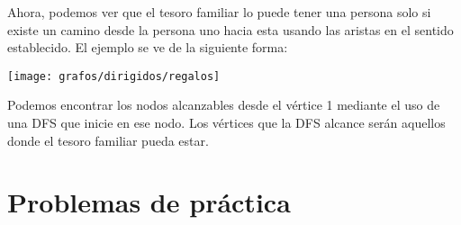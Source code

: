 Ahora, podemos ver que el tesoro familiar lo puede tener una persona solo si existe un camino desde la persona uno hacia esta usando las aristas en el sentido establecido. El ejemplo se ve de la siguiente forma:
\begin{center}
	\texttt{[image: grafos/dirigidos/regalos]}
\end{center}

Podemos encontrar los nodos alcanzables desde el vértice 1 mediante el uso de una DFS que inicie en ese nodo. Los vértices que la DFS alcance serán aquellos donde el tesoro familiar pueda estar.


\section{Problemas de práctica}
\begin{exercise}
\end{exercise}

\begin{exercise}
\end{exercise}